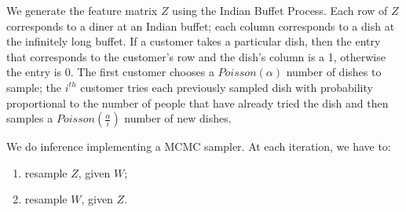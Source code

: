 \documentclass[]{article}
\begin{document}
We generate the feature matrix $Z$ using the Indian Buffet Process. Each row of $Z$ corresponds to a diner at an Indian buffet; each column corresponds to a dish at the infinitely long buffet. If a customer takes a particular dish, then the entry that corresponds to the customer's row and the dish's column is a 1, otherwise the entry is 0. The first customer chooses a $Poisson(\alpha)$ number of dishes to sample; the $i^{th}$ customer tries each previously sampled dish with probability proportional to the number of people that have already tried the dish and then samples a $Poisson(\frac{\alpha}{i})$ number of new dishes. 

We do inference implementing a MCMC sampler. At each iteration, we have to:
\begin{enumerate}
	\item resample $Z$, given $W$;
	\item resample $W$, given $Z$.
\end{enumerate}
\end{document}
